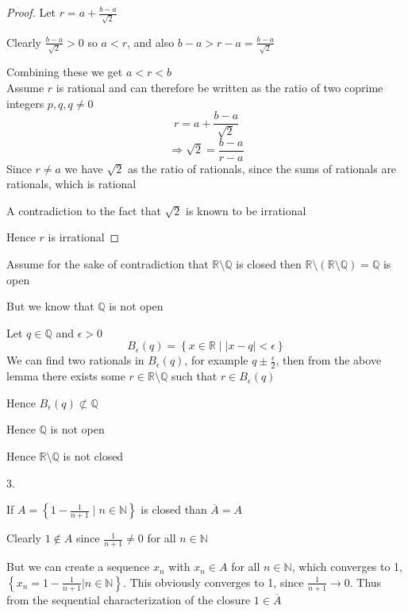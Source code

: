 \documentclass{article}
\begin{document}
\begin{problem}
\begin{solution}
\begin{lemma}
		\begin{proof}
			Let \( r = a + \frac{b-a}{\sqrt{2} } \)

			Clearly \( \frac{b-a}{\sqrt{2}} > 0 \) so \( a < r \), and also \( b-a > r-a = \frac{b-a}{\sqrt{2} } \)

			Combining these we get \( a < r < b \)
			\\

			Assume \( r \) is rational and can therefore be written as the ratio of two coprime integers \( p,q, q \neq 0 \)
			\[
				r = a + \frac{b-a}{\sqrt{2} }
			\]
			\[
				\Rightarrow \sqrt{2}  = \frac{b-a}{r - a}
			\]
			Since \( r \neq a \) we have \( \sqrt{2}  \) as the ratio of rationals, since the sums of rationals are rationals, which is rational

			A contradiction to the fact that \( \sqrt{2}  \) is known to be irrational

			Hence \( r \) is irrational
		\end{proof}
	\end{lemma}

	Assume for the sake of contradiction that \( \mathbb{R}\setminus \mathbb{Q} \) is closed then \( \mathbb{R} \setminus (\mathbb{R} \setminus \mathbb{Q} ) = \mathbb{Q} \) is open

	But we know that \( \mathbb{Q} \) is not open

	Let \( q \in \mathbb{Q} \) and \( \epsilon > 0 \)
	\[
		B_{\epsilon}(q) = \left\{ x \in \mathbb{R} \mid |x-q| < \epsilon \right\}
	\]
	We can find two rationals in \( B_{\epsilon}(q) \), for example \( q \pm \frac{\epsilon}{2} \), then from the above lemma there exists some \( r \in \mathbb{R}\setminus \mathbb{Q} \) such that \( r \in B_{\epsilon}(q) \)

	Hence \( B_{\epsilon}(q) \not\subset \mathbb{Q}\)

	Hence \( \mathbb{Q} \) is not open

	Hence \( \mathbb{R} \setminus \mathbb{Q} \) is not closed
\end{solution}


\begin{solution} 3.

	If \( A = \left\{ 1 - \frac{1}{n+1} \mid n \in \mathbb{N} \right\}  \) is closed than \( \overline{A} = A \)

	Clearly \( 1 \notin A \) since \( \frac{1}{n+1} \neq 0 \) for all \( n \in \mathbb{N} \)

	But we can create a sequence \( x_n \) with \( x_n \in A \) for all \( n \in \mathbb{N} \), which converges to 1, \( \left\{ x_n = 1 - \frac{1}{n+1} | n \in \mathbb{N} \right\}  \). This obviously converges to 1, since \( \frac{1}{n+1} \to 0 \). Thus from the sequential characterization of the closure \( 1 \in \overline{A} \)


\end{solution}
\end{problem}
\end{document}
